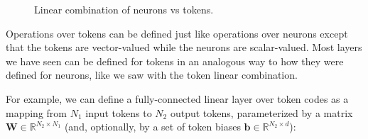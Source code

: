 \begin{figure}[h]
{\begin{minipage}{.49\linewidth}
\end{minipage}
}
\caption{Linear combination of neurons vs tokens.}
\end{figure}

Operations over tokens can be defined just like operations over neurons except that the tokens are vector-valued while the neurons are scalar-valued. Most layers we have seen can be defined for tokens in an analogous way to how they were defined for neurons, like we saw with the token linear combination. %

For example, we can define a fully-connected linear layer over token codes as a mapping from $N_1$ input tokens to $N_2$ output tokens, parameterized by a matrix $\mathbf{W} \in \mathbb{R}^{N_2 \times N_1}$ (and, optionally, by a set of token biases $\mathbf{b} \in \mathbb{R}^{N_2 \times d}$):


